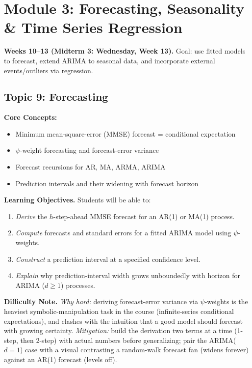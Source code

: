 \documentclass[11pt]{article}
\begin{document}
\section{Module 3: Forecasting, Seasonality \& Time Series Regression}
\textbf{Weeks 10--13 (Midterm 3: Wednesday, Week 13).} Goal: use fitted models to forecast, extend ARIMA to seasonal data, and incorporate external events/outliers via regression.

\subsection{Topic 9: Forecasting}

\textbf{Core Concepts:}
\begin{itemize}
\item Minimum mean-square-error (MMSE) forecast = conditional expectation
\item $\psi$-weight forecasting and forecast-error variance
\item Forecast recursions for AR, MA, ARMA, ARIMA
\item Prediction intervals and their widening with forecast horizon
\end{itemize}

\textbf{Learning Objectives.} Students will be able to:
\begin{enumerate}
\item \emph{Derive} the $h$-step-ahead MMSE forecast for an AR(1) or MA(1) process.
\item \emph{Compute} forecasts and standard errors for a fitted ARIMA model using $\psi$-weights.
\item \emph{Construct} a prediction interval at a specified confidence level.
\item \emph{Explain} why prediction-interval width grows unboundedly with horizon for ARIMA ($d\geq1$) processes.
\end{enumerate}

\textbf{Difficulty Note.} \emph{Why hard:} deriving forecast-error variance via $\psi$-weights is the heaviest symbolic-manipulation task in the course (infinite-series conditional expectations), and clashes with the intuition that a good model should forecast with growing certainty. \emph{Mitigation:} build the derivation two terms at a time (1-step, then 2-step) with actual numbers before generalizing; pair the ARIMA($d=1$) case with a visual contrasting a random-walk forecast fan (widens forever) against an AR(1) forecast (levels off).
\end{document}
